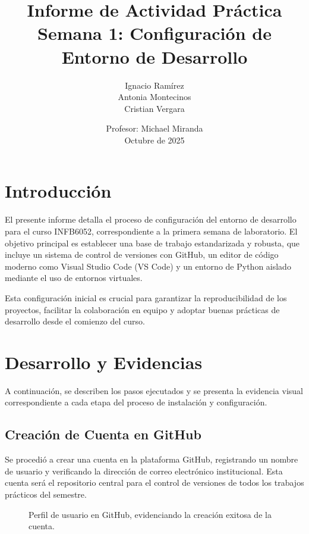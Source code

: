 \documentclass[12pt,a4paper]{article}
\title{
    \vspace{2cm}
    \textbf{Informe de Actividad Práctica} \\
    \textbf{Semana 1: Configuración de Entorno de Desarrollo}
}
\author{Ignacio Ramírez \\ Antonia Montecinos \\ Cristian Vergara}
\date{
    Profesor: Michael Miranda \\
    Octubre de 2025
}
\begin{document}
\begin{titlepage}
    \maketitle
    \thispagestyle{portada}
\end{titlepage}

\tableofcontents
\clearpage

\section{Introducción}
El presente informe detalla el proceso de configuración del entorno de desarrollo para el curso INFB6052, correspondiente a la primera semana de laboratorio. El objetivo principal es establecer una base de trabajo estandarizada y robusta, que incluye un sistema de control de versiones con GitHub, un editor de código moderno como Visual Studio Code (VS Code) y un entorno de Python aislado mediante el uso de entornos virtuales.

Esta configuración inicial es crucial para garantizar la reproducibilidad de los proyectos, facilitar la colaboración en equipo y adoptar buenas prácticas de desarrollo desde el comienzo del curso.

\section{Desarrollo y Evidencias}
A continuación, se describen los pasos ejecutados y se presenta la evidencia visual correspondiente a cada etapa del proceso de instalación y configuración.

\subsection{Creación de Cuenta en GitHub}
Se procedió a crear una cuenta en la plataforma GitHub, registrando un nombre de usuario y verificando la dirección de correo electrónico institucional. Esta cuenta será el repositorio central para el control de versiones de todos los trabajos prácticos del semestre.

\begin{figure}[H]
    \centering
    \caption{Perfil de usuario en GitHub, evidenciando la creación exitosa de la cuenta.}
    \label{fig:github}
\end{figure}
\end{document}
